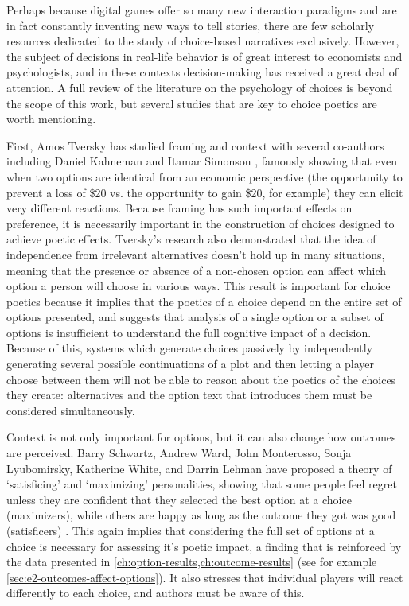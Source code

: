 Perhaps because digital games offer so many new interaction paradigms and are in fact constantly inventing new ways to tell stories, there are few scholarly resources dedicated to the study of choice-based narratives exclusively.
%
However, the subject of decisions in real-life behavior is of great interest to economists and psychologists, and in these contexts decision-making has received a great deal of attention.
%
A full review of the literature on the psychology of choices is beyond the scope of this work, but several studies that are key to choice poetics are worth mentioning.


First, Amos Tversky has studied framing and context with several co-authors including Daniel Kahneman \citep{Tversky1981} and Itamar Simonson \citep{Tversky1993}, famously showing that even when two options are identical from an economic perspective (the opportunity to prevent a loss of \$20 vs\@. the opportunity to gain \$20, for example) they can elicit very different reactions.
%
Because framing has such important effects on preference, it is necessarily important in the construction of choices designed to achieve poetic effects.
%
Tversky's research also demonstrated that the idea of independence from irrelevant alternatives doesn't hold up in many situations, meaning that the presence or absence of a non-chosen option can affect which option a person will choose in various ways.
%
This result is important for choice poetics because it implies that the poetics of a choice depend on the entire set of options presented, and suggests that analysis of a single option or a subset of options is insufficient to understand the full cognitive impact of a decision.
%
Because of this, systems which generate choices passively by independently generating several possible continuations of a plot and then letting a player choose between them will not be able to reason about the poetics of the choices they create: alternatives and the option text that introduces them must be considered simultaneously.


Context is not only important for options, but it can also change how outcomes are perceived.
%
Barry Schwartz, Andrew Ward, John Monterosso, Sonja Lyubomirsky, Katherine White, and Darrin Lehman have proposed a theory of `satisficing' and `maximizing' personalities, showing that some people feel regret unless they are confident that they selected the best option at a choice (maximizers), while others are happy as long as the outcome they got was good (satisficers) \citep{Schwartz2002}.
%
This again implies that considering the full set of options at a choice is necessary for assessing it's poetic impact, a finding that is reinforced by the data presented in \cref{ch:option-results,ch:outcome-results} (see for example \cref{sec:e2-outcomes-affect-options}).
%
It also stresses that individual players will react differently to each choice, and authors must be aware of this.


